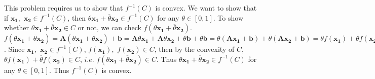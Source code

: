 \documentclass[12pt,letterpaper]{article}
\begin{document}
\section{}
This problem requires us to show that $f^{-1}(C)$ is convex. We want to show that if $\boldsymbol{x_{1}},$ $\boldsymbol{x_{2}} \in f^{-1}(C)$, then $\theta \boldsymbol{x_{1}}+\overline{\theta}\boldsymbol{x_{2}} \in f^{-1}(C)$ for any $\theta \in [0,1]$. To show whether $\theta \boldsymbol{x_{1}}+\overline{\theta}\boldsymbol{x_{2}} \in C$ or not, we can check $f(\theta \boldsymbol{x_{1}}+\overline{\theta}\boldsymbol{x_{2}})$.\\
$f(\theta \boldsymbol{x_{1}}+\overline{\theta}\boldsymbol{x_{2}})=\boldsymbol{A}(\theta \boldsymbol{x_{1}}+\overline{\theta}\boldsymbol{x_{2}})+\boldsymbol{b}=\boldsymbol{A}\theta \boldsymbol{x_{1}}+\boldsymbol{A}\overline{\theta}\boldsymbol{x_{2}}+\theta\boldsymbol{b}+\overline{\theta}\boldsymbol{b}=\theta(\boldsymbol{Ax_{1}}+\boldsymbol{b})+\overline{\theta}(\boldsymbol{Ax_{2}}+\boldsymbol{b})=\theta f(\boldsymbol{x_{1}})+\overline{\theta}f(\boldsymbol{x_{2}})$. Since $\boldsymbol{x_{1}},$ $\boldsymbol{x_{2}} \in f^{-1}(C)$, $f(\boldsymbol{x_{1}}),$ $f(\boldsymbol{x_{2}}) \in C$, then by the convexity of $C$, $\theta f(\boldsymbol{x_{1}})+\overline{\theta}f(\boldsymbol{x_{2}})\in C$, $i.e.$ $f(\theta \boldsymbol{x_{1}}+\overline{\theta}\boldsymbol{x_{2}})\in C$. Thus $\theta \boldsymbol{x_{1}}+\overline{\theta}\boldsymbol{x_{2}} \in f^{-1}(C)$ for any $\theta \in [0,1]$. Thus $f^{-1}(C)$ is convex.
\end{document}
